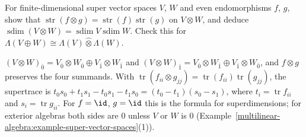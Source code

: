\begin{exercise}\label{multilinear-algebra:exercise-supertrace-tensor}
For finite-dimensional super vector spaces $V$, $W$ and even endomorphisms $f$, $g$, show that $\operatorname{str}(f \otimes g) = \operatorname{str}(f)\operatorname{str}(g)$ on $V \otimes W$, and deduce
$\operatorname{sdim}(V \otimes W) = \operatorname{sdim}V\operatorname{sdim}W$. Check this for $\Lambda(V \oplus W) \cong \Lambda(V) \hat\otimes \Lambda(W)$.
\end{exercise}

\begin{solution}
$(V \otimes W)_{\bar 0} = V_{\bar 0} \otimes W_{\bar 0} \oplus V_{\bar 1} \otimes W_{\bar 1}$ and $(V \otimes W)_{\bar 1} = V_{\bar 0} \otimes W_{\bar 1} \oplus V_{\bar 1} \otimes W_{\bar 0}$, and $f \otimes g$ preserves the four summands.
With $\operatorname{tr}(f_{ii} \otimes g_{jj}) = \operatorname{tr}(f_{ii})\operatorname{tr}(g_{jj})$, the supertrace is $t_0s_0 + t_1s_1 - t_0s_1 - t_1s_0 = (t_0 - t_1)(s_0 - s_1)$, where $t_i = \operatorname{tr}f_{ii}$ and
$s_i = \operatorname{tr}g_{ii}$. For $f = \id$, $g = \id$ this is the formula for superdimensions; for exterior algebras both sides are $0$ unless $V$ or $W$ is $0$
(Example~\ref{multilinear-algebra:example-super-vector-spaces}(1)).
\end{solution}
